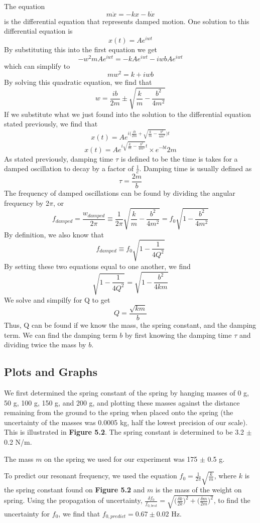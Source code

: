 \documentclass[11pt]{report}
\begin{document}
The equation \[m\ddot{x} = -kx - b\dot{x}\] is the differential equation that
represents damped motion.  One solution to this differential equation is \[x(t)
    = Ae^{iwt}\]  By substituting this into the first equation we get
    \[-w^2mAe^{iwt} = -kAe^{iwt} - iwbAe^{iwt}\] which can simplify to \[mw^2 =
        k + iwb\] By solving this quadratic equation, we find that \[w =
    \frac{ib}{2m} \pm \sqrt{\frac{k}{m} - \frac{b^2}{4m^2}}\]  If we
    substitute what we just found into the solution to the differential equation
    stated previously, we find that \[x(t) = Ae^{i\bigg( \frac{ib}{2m} +
        \sqrt{\frac{k}{m} - \frac{b^2}{4m^2}}  \bigg)t}\] \[x(t) =
    Ae^{i\sqrt{\frac{k}{m} - \frac{b^2}{4m^2}}t} \times e^{-bt}{2m}\]
As stated previously, damping time $\tau$ is defined to be the time is takes for
a damped oscillation to decay by a factor of \(\frac{1}{e}\).  Damping time is
usually defined as \[\tau = \frac{2m}{b}\]
The frequency of damped oscillations can be found by dividing the angular
frequency by 2$\pi$, or \[f_{damped} = \frac{w_{damped}}{2\pi} \equiv
    \frac{1}{2\pi}\sqrt{\frac{k}{m} - \frac{b^2}{4m^2}} = f_0\sqrt{1 -
    \frac{b^2}{4m^2}}\]  By definition, we also know that \[f_{damped} \equiv
f_0\sqrt{1 - \frac{1}{4Q^2}}\]  By setting these two equations equal to one
another, we find \[ \sqrt{1 - \frac{1}{4Q^2}} = \sqrt{1 - \frac{b^2}{4km}}\]
We solve and simpilfy for Q to get \[Q = \frac{\sqrt{km}}{b}\] 
Thus, Q can be found if we know the mass, the spring constant, and the damping
term.  We can find the damping term \(b\) by first knowing the damping time
$\tau$ and dividing twice the mass by \(b\).

\subsection*{Plots and Graphs}

We first determined the spring constant of the spring by hanging masses of 0 g, 50 g,
100 g, 150 g, and 200 g, and plotting these masses against the distance
remaining from the ground to the spring when placed onto the spring (the
uncertainty of the masses was 0.0005 kg, half the lowest precision of our scale).  This is
illustrated in \textbf{Figure 5.2}.  The spring constant is determined to be
3.2 $\pm$ 0.2 N/m.

The mass \(m\) on the spring we used for our experiment was 175 $\pm$ 0.5 g.  

To predict our resonant frequency, we used the equation \(f_0 =
\frac{1}{2\pi}\sqrt{\frac{k}{m}}\), where \(k\) is the spring constant found on
\textbf{Figure 5.2} and \(m\) is the mass of the weight on spring.  Using the
propagation of uncertainty, \(\frac{\delta f_0}{f_{0, best}} =
\sqrt{\bigg(\frac{\delta k}{2k} \bigg)^2 + \bigg(\frac{\delta m}{2m} \bigg)^2}
\), to find the uncertainty for \(f_0\), we find that \(f_{0, predict} = 0.67
\pm 0.02\) Hz. 
\end{document}
